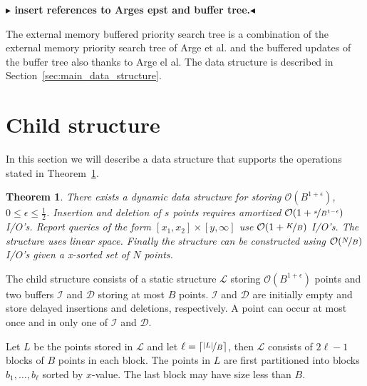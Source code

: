 \documentclass[twoside,11pt,openright]{report}
\newtheorem{theorem}{Theorem}
\newcommand{\todo}[1]{{\color[rgb]{.5,0,0}\textbf{$\blacktriangleright$#1$\blacktriangleleft$}}}
\begin{document}
\todo{ insert references to Arges epst and buffer tree.}

The external memory buffered priority search tree is a combination of the external memory priority search tree of Arge et al. and the buffered updates of the buffer tree also thanks to Arge el al. The data structure is described in Section~\ref{sec:main_data_structure}.

\section{Child structure} %
\label{sec:child_structure}
In this section we will describe a data structure that supports the operations stated in Theorem~\ref{thm:child_structure}.
\begin{theorem}
\label{thm:child_structure}
There exists a dynamic data structure for storing $\mathcal{O}(B^{1+\epsilon})$, $0 \leq \epsilon \leq \frac{1}{2}$.
Insertion and deletion of $s$ points requires amortized $\mathcal{O}(1+\nicefrac{s}{B^{1-\epsilon}})$ I/O's.
Report queries of the form $[x_1,x_2] \times [y,\infty]$ use $\mathcal{O}(1+\nicefrac{K}{B})$ I/O's.
The structure uses linear space.
Finally the structure can be constructed using $\mathcal{O}(\nicefrac{N}{B})$ I/O's given a x-sorted set of $N$ points.
\end{theorem}

The child structure consists of a static structure $\mathcal{L}$ storing $\mathcal{O}(B^{1+\epsilon})$ points and two buffers $\mathcal{I}$ and $\mathcal{D}$ storing at most $B$ points. $\mathcal{I}$ and $\mathcal{D}$ are initially empty and store delayed insertions and deletions, respectively. A point can occur at most once and in only one of $\mathcal{I}$ and $\mathcal{D}$.

Let $L$ be the points stored in $\mathcal{L}$ and let $\ell = \lceil \nicefrac{\vert L \vert}{B}\rceil$, then $\mathcal{L}$ consists of $2\ell-1$ blocks of $B$ points in each block. The points in $L$ are first partitioned into blocks $b_1,\dots,b_\ell$ sorted by $x$-value. The last block may have size less than $B$.
\end{document}
